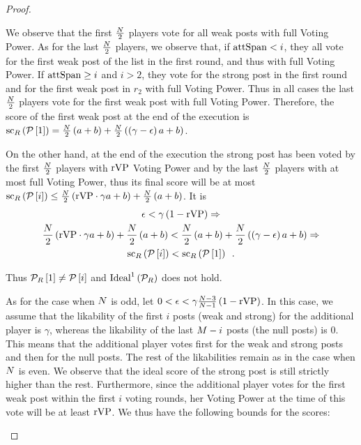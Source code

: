 \documentclass[a4paper,english,cleveref, autoref]{oasics-v2019}
\begin{document}
\begin{subappendices}
\begin{proof}
\begin{itemize}
    We observe that the first $\frac{N}{2}$ players vote for all weak
    posts with full Voting Power. As for the last $\frac{N}{2}$
    players, we observe that, if $\mathrm{attSpan} < i$, they all vote for the first
    weak post of the list in the first round, and thus with full Voting Power. If
    $\mathrm{attSpan} \geq i$ and $i > 2$, they vote for the strong post in the first
    round and for the first weak post in $r_2$ with full Voting Power. Thus in
    all cases the last $\frac{N}{2}$ players vote for the first weak
    post with full Voting Power. Therefore, the score of the first weak post at
    the end of the execution is
    $\mathrm{sc}_{R}\left(\mathcal{P}\left[1\right]\right) =
    \frac{N}{2}\left(a + b\right) +
    \frac{N}{2}\left(\left(\gamma - \epsilon\right) a + b\right)$.

    On the other hand, at the end of the execution the strong post has been
    voted by the first $\frac{N}{2}$ players with $\mathrm{rVP}$
    Voting Power and by the last $\frac{N}{2}$ players with at most
    full Voting Power, thus its final score will be at most
    $\mathrm{sc}_{R}\left(\mathcal{P}\left[i\right]\right) \leq
    \frac{N}{2}\left(\mathrm{rVP} \cdot \gamma a + b\right) +
    \frac{N}{2}\left(a + b\right)$. It is
    \begin{gather*}
      \epsilon < \gamma\left(1 - \mathrm{rVP}\right) \Rightarrow \\
      \frac{N}{2}\left(\mathrm{rVP} \cdot \gamma a + b\right) +
      \frac{N}{2}\left(a + b\right) < \frac{N}{2}\left(a +
      b\right) + \frac{N}{2}\left(\left(\gamma - \epsilon\right) a +
      b\right) \Rightarrow \\
      \mathrm{sc}_{R}\left(\mathcal{P}\left[i\right]\right) <
      \mathrm{sc}_{R}\left(\mathcal{P}\left[1\right]\right) \enspace.
    \end{gather*}

    Thus $\mathcal{P}_{R}\left[1\right] \neq \mathcal{P}\left[i\right]$ and
    $\mathrm{Ideal}^1\left(\mathcal{P}_{R}\right)$ does not hold.

    As for the case when $N$ is odd, let $0 < \epsilon <
    \gamma\frac{N - 3}{N - 1}\left(1 - \mathrm{rVP}\right)$. In this
    case, we assume that the likability of the first $i$ posts (weak and strong)
    for the additional player is $\gamma$, whereas the likability of the last
    $M - i$ posts (the null posts) is 0. This means that the additional
    player votes first for the weak and strong posts and then for the null
    posts. The rest of the likabilities remain as in the case when $N$
    is even. We observe that the ideal score of the strong post is still
    strictly higher than the rest. Furthermore, since the additional player
    votes for the first weak post within the first $i$ voting rounds, her Voting
    Power at the time of this vote will be at least $\mathrm{rVP}$. We thus have the
    following bounds for the scores:


\end{itemize}
\end{proof}
\end{subappendices}
\end{document}
